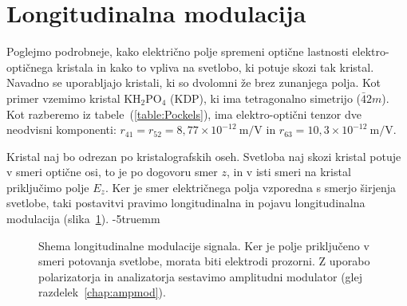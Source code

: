 \section{Longitudinalna modulacija}
Poglejmo podrobneje, kako električno polje spremeni optične lastnosti 
elektro-optičnega kristala in kako to vpliva na svetlobo, ki potuje skozi tak kristal.
Navadno se uporabljajo kristali, ki so dvolomni že brez zunanjega polja. 
Kot primer vzemimo kristal KH$_{2}$PO$_{4}$ (KDP), ki ima tetragonalno 
simetrijo ($\bar{4}2m$). Kot razberemo iz tabele~(\ref{table:Pockels}), ima 
elektro-optični tenzor dve neodvisni komponenti: $r_{41} = r_{52}=8,77 \times 10^{-12}~\si{\m/\V}$
in $r_{63}= 10,3 \times 10^{-12}~\si{\m/\V}$.

Kristal naj bo odrezan po kristalografskih oseh. Svetloba naj skozi kristal potuje 
v smeri optične osi, to je po dogovoru smer $z$, in v isti smeri na kristal priključimo
polje $E_z$. Ker je smer električnega polja vzporedna s smerjo širjenja svetlobe, taki 
postavitvi pravimo longitudinalna in pojavu longitudinalna 
modulacija (slika~\ref{fig:amshema}). 
\vglue-5truemm
\begin{figure}[ht]
\centering
\def\svgwidth{80truemm} 

\caption{Shema longitudinalne modulacije signala. Ker je polje priključeno v smeri
potovanja svetlobe, morata biti elektrodi prozorni. Z uporabo polarizatorja in 
analizatorja sestavimo amplitudni modulator (glej razdelek~\ref{chap:ampmod}).}
\label{fig:amshema}
\end{figure}

